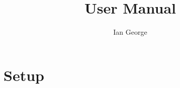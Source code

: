 \documentclass[letterpaper, 10 pt]{report}
\begin{document}
\title{User Manual}
\author{Ian George}
\maketitle
\pagestyle{empty}

\tableofcontents
\newpage

\section{Setup}


\newpage

\end{document}
